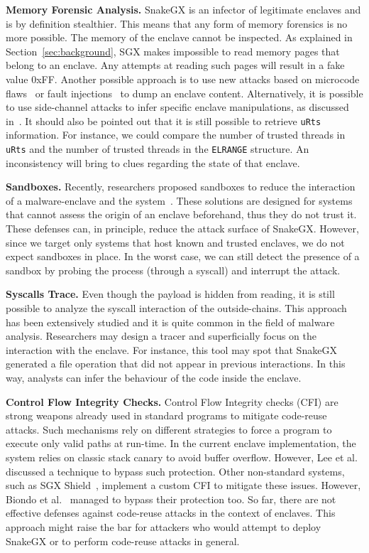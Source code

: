 \textbf{Memory Forensic Analysis.}
SnakeGX is an infector of legitimate enclaves and is by definition 
stealthier.
This means that any form of memory forensics is no more possible. The memory of 
the enclave cannot be inspected. As explained in Section~\ref{sec:background},
SGX makes impossible to read memory pages that belong to an enclave.
Any attempts at reading such pages will result in a fake value $0$xFF.
Another possible approach is to use new attacks based on 
microcode flaws~\cite{foreshadow} or fault 
injections~\cite{Murdock2019plundervolt} to dump an enclave content.
Alternatively, it is possible to use side-channel attacks to 
infer specific enclave manipulations, as discussed in~\cite{216033}.
It should also be pointed out that it is still possible to retrieve 
\texttt{uRts} information.
For instance, we could compare the number of trusted threads in \texttt{uRts} 
and 
the number of trusted threads in the \texttt{ELRANGE} structure.
An inconsistency will bring to clues regarding the state of that enclave.

\textbf{Sandboxes.}
Recently, researchers proposed sandboxes to reduce the 
interaction of a malware-enclave and the system~\cite{sgxjail}.
These solutions are designed for systems that cannot assess the 
origin of an enclave beforehand, thus they do not trust it.
These defenses can, in principle, reduce the attack surface of SnakeGX.
However, since we target only systems that host known and trusted enclaves, we 
do not expect sandboxes in place.
In the worst case, we can still detect the presence of a sandbox by probing the 
process (\ie through a syscall) and interrupt the attack.

\textbf{Syscalls Trace.}
Even though the payload is hidden from reading,
it is still possible to analyze the syscall interaction of the outside-chains.
This approach has been extensively studied and it is quite common in the field 
of malware analysis.
Researchers may design a tracer and superficially focus on the interaction with 
the enclave.
For instance, this tool may spot that SnakeGX generated a file operation that 
did not appear in previous interactions. In this way, analysts can infer the 
behaviour of the code inside the enclave.

\textbf{Control Flow Integrity Checks.}
Control Flow Integrity checks (CFI) are strong weapons already used
in standard programs to mitigate code-reuse attacks.
Such mechanisms rely on different strategies to force a program to execute only 
valid paths at run-time.
In the current enclave implementation, the system relies on
classic stack canary to avoid buffer overflow.
However, Lee et al.~\cite{lee2017hacking} discussed a technique to bypass such 
protection.
Other non-standard systems, such as SGX
Shield~\cite{seo2017sgx}, implement a custom CFI to mitigate these
issues.
However, Biondo et al.~\cite{biondo2018guard} managed to bypass
their protection too.
So far, there are not effective defenses against code-reuse attacks in the 
context of enclaves.
This approach might raise the bar for attackers who would attempt to deploy 
SnakeGX or to perform code-reuse attacks in general.

